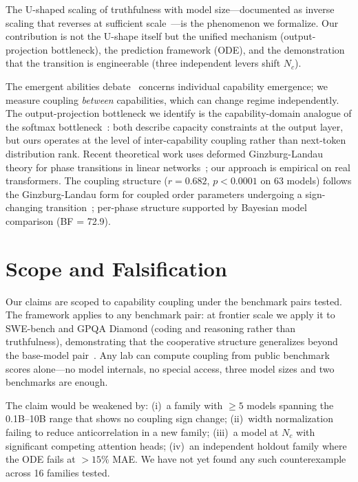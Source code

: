 \documentclass{article}
\begin{document}
The U-shaped scaling of truthfulness with model size---documented as inverse scaling
that reverses at sufficient scale~\cite{mckenzie2023,wei2023usha}---is the phenomenon we formalize.
Our contribution is not the U-shape itself but the unified mechanism (output-projection bottleneck),
the prediction framework (ODE), and the demonstration that
the transition is engineerable (three independent levers shift $N_c$).

The emergent abilities debate~\cite{wei2022,schaeffer2023} concerns individual capability emergence;
we measure coupling \emph{between} capabilities, which can change regime independently.
The output-projection bottleneck we identify is the capability-domain analogue of
the softmax bottleneck~\cite{yang2018softmax}: both describe capacity constraints at the
output layer, but ours operates at the level of inter-capability coupling rather than
next-token distribution rank.
Recent theoretical work uses deformed Ginzburg-Landau theory for phase transitions
in linear networks~\cite{arolafernandez2024collective}; our approach is empirical on real transformers.
The coupling structure ($r = 0.682$, $p < 0.0001$ on 63 models)
follows the Ginzburg-Landau form for coupled order parameters
undergoing a sign-changing transition~\cite{amin2020};
per-phase structure supported by Bayesian model comparison (BF = 72.9).

\section{Scope and Falsification}
\label{sec:scope}

Our claims are scoped to capability coupling under the benchmark pairs tested.
The framework applies to any benchmark pair: at frontier scale we apply it to
SWE-bench and GPQA Diamond (coding and reasoning rather than truthfulness),
demonstrating that the cooperative structure generalizes
beyond the base-model pair~\cite{amin2026growing}.
Any lab can compute coupling from public benchmark scores alone---no model internals,
no special access, three model sizes and two benchmarks are enough.

The claim would be weakened by:
(i)~a family with $\geq 5$ models spanning the 0.1B--10B range that shows no coupling sign change;
(ii)~width normalization failing to reduce anticorrelation in a new family;
(iii)~a model at $N_c$ with significant competing attention heads;
(iv)~an independent holdout family where the ODE fails at $> 15\%$ MAE.
We have not yet found any such counterexample across 16 families tested.
\end{document}

